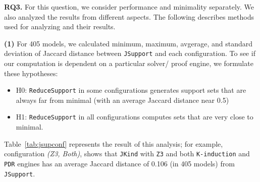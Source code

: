 

%
%
\vspace{6pt}
\noindent{}
 \vspace{6pt}

\textbf{RQ3.}   For this question, we consider performance and minimality separately.  We also analyzed the results from different aspects. The following describes methods used for analyzing and their results.

\textbf{(1)} For 405 models, we calculated minimum, maximum, avgerage, and standard deviation of Jaccard distance between \texttt{JSupport} and each configuration. To see if our computation is dependent on a particular solver/ proof engine, we formulate these hypotheses:
\begin{itemize}
  \item H0: \texttt{ReduceSupport} in some configurations generates support sets that are always far from minimal (with an average Jaccard distance near 0.5)
  \item H1: \texttt{ReduceSupport} in all configurations computes sets that are very close to minimal.
\end{itemize}

Table~\ref{tab:jsupconf} represents the result of this analysis; for example, configuration \emph{(Z3, Both)}, shows that \texttt{JKind} with \texttt{Z3} and both \texttt{K-induction} and \texttt{PDR} engines has an average Jaccard distance of 0.106 (in 405 models) from \texttt{JSupport}.


